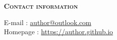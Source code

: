 
\begin{adjustwidth}{0cm}{1cm} %
{\vspace{4mm} \color{sophia} \small \bfseries {} \selectfont \scshape Contact information} \vspace{3mm}
\end{adjustwidth}

\noindent E-mail \hspace{30.8mm} : \hspace{2.4mm} \href{mailto:author@outlook.com}{author@outlook.com} \\
Homepage \hspace{24.9mm} : \hspace{2.4mm} \href{https://author.github.io}{https://author.github.io}